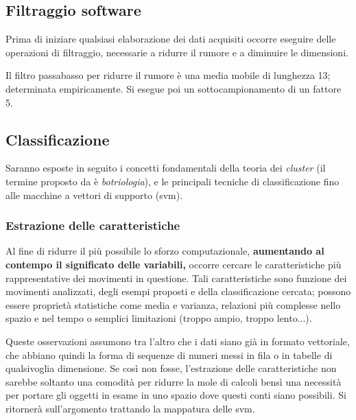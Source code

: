 
\subsection{Filtraggio software}
\label{ssez:filtraggio}

Prima di iniziare qualsiasi elaborazione dei dati acquisiti
occorre eseguire delle operazioni di filtraggio,
necessarie a ridurre il rumore e
a diminuire le dimensioni.

Il filtro passabasso per ridurre il rumore è
una media mobile di lunghezza 13;
determinata empiricamente.
Si esegue poi un sottocampionamento di un fattore 5.





\subsection{Classificazione}
\label{ssez:classificazione}

Saranno esposte in seguito i concetti fondamentali
della teoria dei \textit{cluster}
(il termine proposto da \cite{cit:fuzzy} è \textit{botriologia}\footnotemark{}),
e le principali tecniche di classificazione
fino alle macchine a vettori di supporto (\ac{svm}).


\subsubsection{Estrazione delle caratteristiche}
\label{sssez:estrazione}

Al fine di ridurre il più possibile lo sforzo computazionale,
\textbf{aumentando al contempo il significato delle variabili,}
occorre cercare le caratteristiche più rappresentative
dei movimenti in questione.
Tali caratteristiche sono funzione dei movimenti analizzati,
degli esempi proposti e
della classificazione cercata;
possono essere proprietà statistiche come media e varianza,
relazioni più complesse nello spazio e nel tempo
o semplici limitazioni (troppo ampio, troppo lento...).

Queste osservazioni assumono tra l'altro che i dati
siano già in formato vettoriale,
che abbiano quindi la forma di sequenze di numeri
messi in fila o in tabelle di qualsivoglia dimensione.
Se così non fosse, l'estrazione delle caratteristiche
non sarebbe soltanto una comodità per ridurre la mole di calcoli
bensì una necessità per portare gli oggetti in esame
in uno spazio dove questi conti siano possibili.
Si ritornerà sull'argomento trattando
la mappatura delle \ac{svm}.



